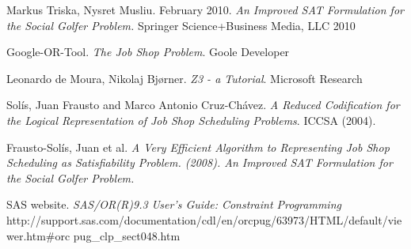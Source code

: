 \begin{thebibliography}{1}

\bibitem{} Markus Triska, Nysret Musliu. February 2010. {\em An Improved SAT Formulation for the Social Golfer Problem.} Springer Science+Business Media, LLC 2010

\bibitem{}  Google-OR-Tool. {\em The Job Shop Problem}. Goole Developer

\bibitem{} Leonardo de Moura, Nikolaj Bjørner. {\em Z3 - a Tutorial}. Microsoft Research

\bibitem{} Solís, Juan Frausto and Marco Antonio Cruz-Chávez. {\em A Reduced Codification for the Logical Representation of Job Shop Scheduling Problems}. ICCSA (2004).

\bibitem{} Frausto-Solís, Juan et al. {\em A Very Efficient Algorithm to Representing Job Shop Scheduling as Satisfiability Problem. (2008). An Improved SAT Formulation for the Social Golfer Problem.
}

\bibitem{} SAS website. {\em SAS/OR(R)9.3 User's Guide: Constraint Programming} \\
http://support.sas.com/documentation/cdl/en/orcpug/63973/HTML/default/viewer.htm\#orc
pug\_clp\_sect048.htm

\end{thebibliography}
